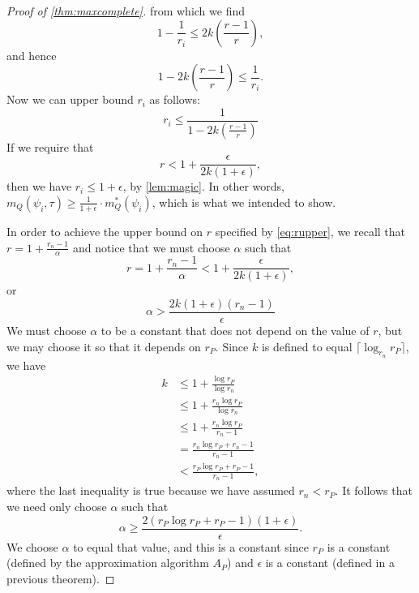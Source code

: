 \documentclass[]{article}
\theoremstyle{plain}
\theoremstyle{definition}
\newcommand{\ceil}[1]{\lceil{#1}\rceil}
\begin{document}
\begin{proof}[Proof of \autoref{thm:maxcomplete}]
  from which we find
  \begin{equation*}
    1 - \frac{1}{r_i} \leq 2k\left(\frac{r - 1}{r}\right),
  \end{equation*}
  and hence
  \begin{equation*}
    1 - 2k\left(\frac{r - 1}{r}\right) \leq \frac{1}{r_i}.
  \end{equation*}
  Now we can upper bound $r_i$ as follows:
  \begin{equation*}
    r_i \leq \frac{1}{1 - 2k\left(\frac{r - 1}{r}\right)}
  \end{equation*}
  If we require that
  \begin{equation}\label{eq:rupper}
    r < 1 + \frac{\epsilon}{2k(1 + \epsilon)},
  \end{equation}
  then we have $r_i \leq 1 + \epsilon$, by \autoref{lem:magic}.
  In other words, $m_Q(\psi_i, \tau) \geq \frac{1}{1 + \epsilon} \cdot m^*_Q(\psi_i)$, which is what we intended to show.

  In order to achieve the upper bound on $r$ specified by \autoref{eq:rupper}, we recall that $r = 1 + \frac{r_n - 1}{\alpha}$ and notice that we must choose $\alpha$ such that
  \begin{equation*}
    r = 1 + \frac{r_n - 1}{\alpha} < 1 + \frac{\epsilon}{2k(1 + \epsilon)},
  \end{equation*}
  or
  \begin{equation*}
    \alpha > \frac{2k(1 + \epsilon)(r_n - 1)}{\epsilon}
  \end{equation*}
  We must choose $\alpha$ to be a constant that does not depend on the value of $r$, but we may choose it so that it depends on $r_P$.
  Since $k$ is defined to equal $\ceil{\log_{r_n}{r_P}}$, we have
  \begin{align*}
    k & \leq 1 + \frac{\log{r_P}}{\log{r_n}} \\
    & \leq 1 + \frac{r_n \log{r_P}}{\log{r_n}} \\
    & \leq 1 + \frac{r_n \log{r_P}}{r_n - 1} \\
    & = \frac{r_n \log{r_P} + r_n - 1}{r_n - 1} \\
    & < \frac{r_P \log{r_P} + r_P - 1}{r_n - 1},
  \end{align*}
  where the last inequality is true because we have assumed $r_n < r_P$.
  It follows that we need only choose $\alpha$ such that
  \begin{equation*}
    \alpha \geq \frac{2(r_P \log{r_P} + r_P - 1)(1 + \epsilon)}{\epsilon}.
  \end{equation*}
  We choose $\alpha$ to equal that value, and this is a constant since $r_P$ is a constant (defined by the approximation algorithm $A_P$) and $\epsilon$ is a constant (defined in a previous theorem).


\end{proof}
\end{document}
